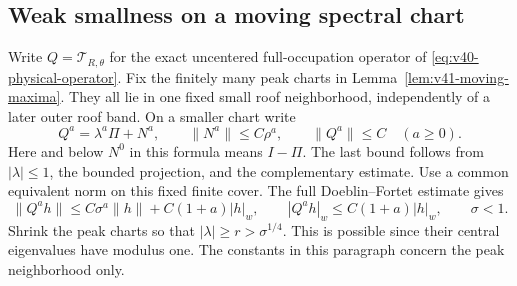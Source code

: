 \subsection{Weak smallness on a moving spectral chart}
Write $Q=\mathscr T_{R,\theta}$ for the exact uncentered full-occupation
operator of \eqref{eq:v40-physical-operator}. Fix the finitely many
peak charts in Lemma~\ref{lem:v41-moving-maxima}. They all lie in
one fixed small roof neighborhood, independently of a later outer
roof band. On a smaller chart write
\[
 Q^a=\lambda^a\Pi+N^a,\qquad
 \|N^a\|\le C\rho^a,
 \qquad \|Q^a\|\le C \quad(a\ge0).
\]
Here and below $N^0$ in this formula means $I-\Pi$.
The last bound follows from $|\lambda|\le1$, the bounded projection,
and the complementary estimate. Use a common equivalent norm on
this fixed finite cover. The full Doeblin--Fortet estimate gives
\begin{equation}\label{eq:v48-chart-DF}
 \|Q^a h\|\le C\sigma^a\|h\|+C(1+a)|h|_w,
 \qquad |Q^a h|_w\le C(1+a)|h|_w,
 \qquad \sigma<1.
\end{equation}
Shrink the peak charts so that $|\lambda|\ge r>\sigma^{1/4}$.
This is possible since their central eigenvalues have modulus one.
The constants in this paragraph concern the peak neighborhood only.

